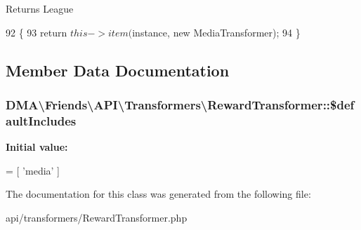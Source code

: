 \begin{DoxyReturn}{Returns}
League 
\end{DoxyReturn}

\begin{DoxyCode}
92     \{
93         \textcolor{keywordflow}{return} $this->item($instance, \textcolor{keyword}{new} MediaTransformer);
94     \}
\end{DoxyCode}


\subsection{Member Data Documentation}
\hypertarget{classDMA_1_1Friends_1_1API_1_1Transformers_1_1RewardTransformer_a303f3145936aae98cbdc990fa104be71}{}
\subsubsection[{\$default\+Includes}]{\setlength{\rightskip}{0pt plus 5cm}D\+M\+A\textbackslash{}\+Friends\textbackslash{}\+A\+P\+I\textbackslash{}\+Transformers\textbackslash{}\+Reward\+Transformer\+::\$default\+Includes\hspace{0.3cm}{\ttfamily [protected]}}\label{classDMA_1_1Friends_1_1API_1_1Transformers_1_1RewardTransformer_a303f3145936aae98cbdc990fa104be71}
{\bfseries Initial value\+:}
\begin{DoxyCode}
= [
            \textcolor{stringliteral}{'media'}
    ]
\end{DoxyCode}


The documentation for this class was generated from the following file\+:\begin{DoxyCompactItemize}
\item 
api/transformers/Reward\+Transformer.\+php\end{DoxyCompactItemize}
